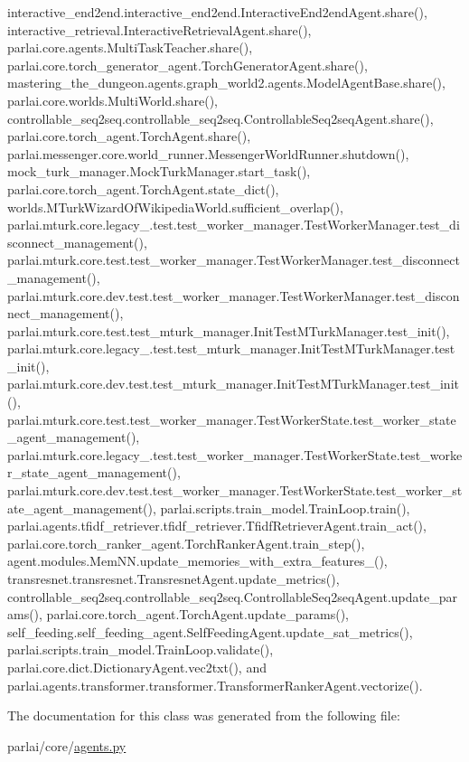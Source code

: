 interactive\+\_\+end2end.\+interactive\+\_\+end2end.\+Interactive\+End2end\+Agent.\+share(), interactive\+\_\+retrieval.\+Interactive\+Retrieval\+Agent.\+share(), parlai.\+core.\+agents.\+Multi\+Task\+Teacher.\+share(), parlai.\+core.\+torch\+\_\+generator\+\_\+agent.\+Torch\+Generator\+Agent.\+share(), mastering\+\_\+the\+\_\+dungeon.\+agents.\+graph\+\_\+world2.\+agents.\+Model\+Agent\+Base.\+share(), parlai.\+core.\+worlds.\+Multi\+World.\+share(), controllable\+\_\+seq2seq.\+controllable\+\_\+seq2seq.\+Controllable\+Seq2seq\+Agent.\+share(), parlai.\+core.\+torch\+\_\+agent.\+Torch\+Agent.\+share(), parlai.\+messenger.\+core.\+world\+\_\+runner.\+Messenger\+World\+Runner.\+shutdown(), mock\+\_\+turk\+\_\+manager.\+Mock\+Turk\+Manager.\+start\+\_\+task(), parlai.\+core.\+torch\+\_\+agent.\+Torch\+Agent.\+state\+\_\+dict(), worlds.\+M\+Turk\+Wizard\+Of\+Wikipedia\+World.\+sufficient\+\_\+overlap(), parlai.\+mturk.\+core.\+legacy\+\_.\+test.\+test\+\_\+worker\+\_\+manager.\+Test\+Worker\+Manager.\+test\+\_\+disconnect\+\_\+management(), parlai.\+mturk.\+core.\+test.\+test\+\_\+worker\+\_\+manager.\+Test\+Worker\+Manager.\+test\+\_\+disconnect\+\_\+management(), parlai.\+mturk.\+core.\+dev.\+test.\+test\+\_\+worker\+\_\+manager.\+Test\+Worker\+Manager.\+test\+\_\+disconnect\+\_\+management(), parlai.\+mturk.\+core.\+test.\+test\+\_\+mturk\+\_\+manager.\+Init\+Test\+M\+Turk\+Manager.\+test\+\_\+init(), parlai.\+mturk.\+core.\+legacy\+\_.\+test.\+test\+\_\+mturk\+\_\+manager.\+Init\+Test\+M\+Turk\+Manager.\+test\+\_\+init(), parlai.\+mturk.\+core.\+dev.\+test.\+test\+\_\+mturk\+\_\+manager.\+Init\+Test\+M\+Turk\+Manager.\+test\+\_\+init(), parlai.\+mturk.\+core.\+test.\+test\+\_\+worker\+\_\+manager.\+Test\+Worker\+State.\+test\+\_\+worker\+\_\+state\+\_\+agent\+\_\+management(), parlai.\+mturk.\+core.\+legacy\+\_.\+test.\+test\+\_\+worker\+\_\+manager.\+Test\+Worker\+State.\+test\+\_\+worker\+\_\+state\+\_\+agent\+\_\+management(), parlai.\+mturk.\+core.\+dev.\+test.\+test\+\_\+worker\+\_\+manager.\+Test\+Worker\+State.\+test\+\_\+worker\+\_\+state\+\_\+agent\+\_\+management(), parlai.\+scripts.\+train\+\_\+model.\+Train\+Loop.\+train(), parlai.\+agents.\+tfidf\+\_\+retriever.\+tfidf\+\_\+retriever.\+Tfidf\+Retriever\+Agent.\+train\+\_\+act(), parlai.\+core.\+torch\+\_\+ranker\+\_\+agent.\+Torch\+Ranker\+Agent.\+train\+\_\+step(), agent.\+modules.\+Mem\+N\+N.\+update\+\_\+memories\+\_\+with\+\_\+extra\+\_\+features\+\_\+(), transresnet.\+transresnet.\+Transresnet\+Agent.\+update\+\_\+metrics(), controllable\+\_\+seq2seq.\+controllable\+\_\+seq2seq.\+Controllable\+Seq2seq\+Agent.\+update\+\_\+params(), parlai.\+core.\+torch\+\_\+agent.\+Torch\+Agent.\+update\+\_\+params(), self\+\_\+feeding.\+self\+\_\+feeding\+\_\+agent.\+Self\+Feeding\+Agent.\+update\+\_\+sat\+\_\+metrics(), parlai.\+scripts.\+train\+\_\+model.\+Train\+Loop.\+validate(), parlai.\+core.\+dict.\+Dictionary\+Agent.\+vec2txt(), and parlai.\+agents.\+transformer.\+transformer.\+Transformer\+Ranker\+Agent.\+vectorize().



The documentation for this class was generated from the following file\+:\begin{DoxyCompactItemize}
\item 
parlai/core/\hyperlink{parlai_2core_2agents_8py}{agents.\+py}\end{DoxyCompactItemize}
